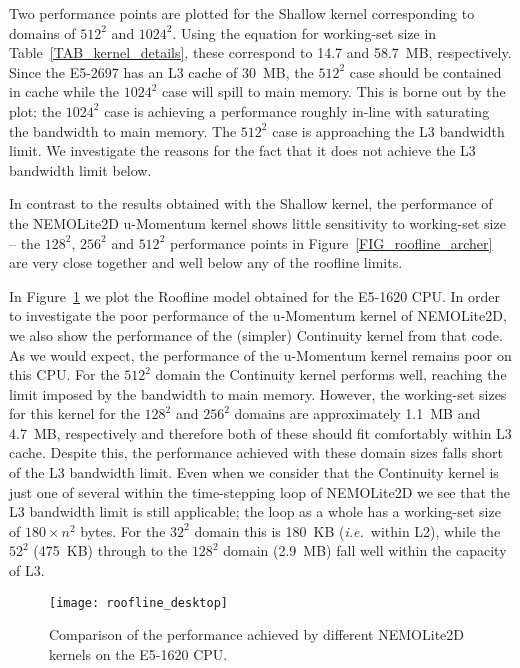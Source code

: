 \documentclass[12pt]{article}
\begin{document}
Two performance points are plotted for the Shallow kernel
corresponding to domains of $512^2$ and $1024^2$. Using the equation
for working-set size in Table~\ref{TAB_kernel_details}, these
correspond to 14.7 and 58.7~MB, respectively. Since the E5-2697 has an
L3 cache of 30~MB, the $512^2$ case should be contained in cache while
the $1024^2$ case will spill to main memory. This is borne out by the
plot; the $1024^2$ case is achieving a performance roughly in-line
with saturating the bandwidth to main memory. The $512^2$ case is
approaching the L3 bandwidth limit. We investigate the reasons for the
fact that it does not achieve the L3 bandwidth limit below.
 
In contrast to the results obtained with the Shallow kernel, the
performance of the NEMOLite2D u-Momentum kernel shows little
sensitivity to working-set size -- the $128^2$, $256^2$ and $512^2$
performance points in Figure~\ref{FIG_roofline_archer} are very close
together and well below any of the roofline limits.

In Figure~\ref{FIG_roofline_desktop} we plot the Roofline model
obtained for the E5-1620 CPU. In order to investigate the poor
performance of the u-Momentum kernel of NEMOLite2D, we also show the
performance of the (simpler) Continuity kernel from that code. As we
would expect, the performance of the u-Momentum kernel remains poor on
this CPU. For the $512^2$ domain the Continuity kernel performs well,
reaching the limit imposed by the bandwidth to main memory. However,
the working-set sizes for this kernel for the $128^2$ and $256^2$
domains are approximately 1.1~MB and 4.7~MB, respectively and
therefore both of these should fit comfortably within L3
cache. Despite this, the performance achieved with these domain sizes
falls short of the L3 bandwidth limit.  Even when we consider that the
Continuity kernel is just one of several within the time-stepping loop
of NEMOLite2D we see that the L3 bandwidth limit is still applicable;
the loop as a whole has a working-set size of $180\times n^{2}$
bytes. For the $32^2$ domain this is 180~KB ({\it i.e.}\ within L2),
while the $52^2$ (475~KB) through to the $128^2$ domain (2.9~MB) fall
well within the capacity of L3.

\begin{figure}
\centering
\texttt{[image: roofline\_desktop]}
\caption{Comparison of the performance achieved by different
  NEMOLite2D kernels on the E5-1620 CPU.}
\label{FIG_roofline_desktop}
\end{figure}
\end{document}
